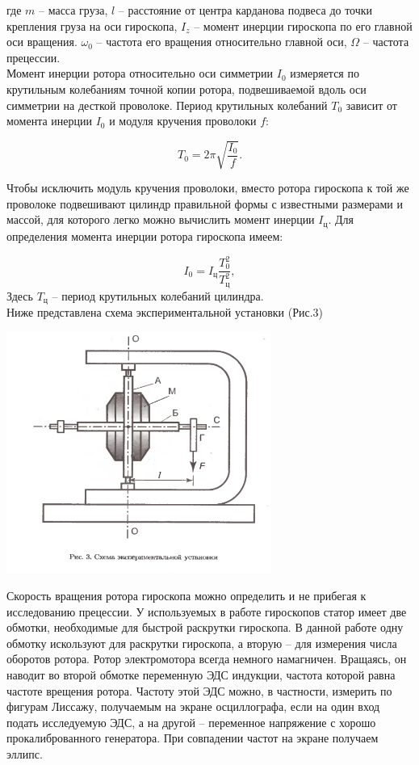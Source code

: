 \documentclass[a4paper,14pt]{extarticle}
\begin{document}
	где $m$ -- масса груза, $l$ -- расстояние от центра карданова подвеса до точки крепления груза на оси гироскопа, $I_z$ -- момент инерции гироскопа по его главной оси вращения. $\omega_0$ -- частота его вращения относительно главной оси, $\Omega$ -- частота прецессии.\\
	Момент инерции ротора относительно оси симметрии $I_0$ измеряется по крутильным колебаниям точной копии ротора, подвешиваемой вдоль оси симметрии на десткой проволоке. Период крутильных колебаний $T_0$ зависит от момента инерции $I_0$ и модуля кручения проволоки $f$:
	
	\begin{equation}
		T_0 = 2\pi\sqrt{\frac{I_0}{f}}.
	\end{equation}
	
	Чтобы исключить модуль кручения проволоки, вместо ротора гироскопа к той же проволоке подвешивают цилиндр правильной формы с известными размерами и массой, для которого легко можно вычислить момент инерции $I_\text{ц}$. Для определения момента инерции ротора гироскопа имеем:
	
	\begin{equation}
		I_0 = I_\text{ц}\frac{T_0^2}{T_\text{ц}^2},
		\label{moment}
	\end{equation}
	Здесь $T_\text{ц}$ -- период крутильных колебаний цилиндра.\\
	
	Ниже представлена схема экспериментальной установки (Рис.3\footnotemark)
	\begin{center}
		\includegraphics[width=0.65\textwidth]{pic3.png}
	\end{center}
	
	Скорость вращения ротора гироскопа можно определить и не прибегая к исследованию прецессии. У используемых в работе гироскопов статор имеет две обмотки, необходимые для быстрой раскрутки гироскопа. В данной работе одну обмотку искользуют для раскрутки гироскопа, а вторую -- для измерения числа оборотов ротора. Ротор электромотора всегда немного намагничен. Вращаясь, он наводит во второй обмотке переменную ЭДС индукции, частота которой равна частоте врещения ротора. Частоту этой ЭДС можно, в частности, измерить по фигурам Лиссажу, получаемым на экране осциллографа, если на один вход подать исследуемую ЭДС, а на другой -- переменное напряжение с хорошо прокалиброванного генератора. При совпадении частот на экране получаем эллипс.
	
\end{document}
